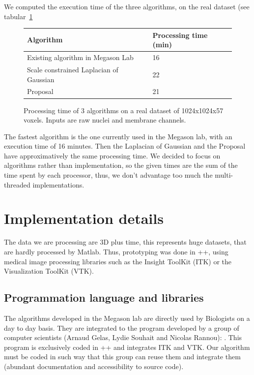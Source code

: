 We computed the execution time of the three algorithms, on the real dataset (see tabular~\ref{tab:timeEval}
\begin{figure}[htb]
\begin{center}
\begin{tabular}{|l|l|}
\hline Algorithm & Processing time (min) \\ 
\hline Existing algorithm in Megason Lab & 16 \\ 
\hline Scale constrained Laplacian of Gaussian &  22 \\ 
\hline Proposal & 21 \\
\hline
\end{tabular}
\end{center}
\caption{Processing time of 3 algorithms on a real dataset of 1024x1024x57 voxels. Inputs are raw nuclei and membrane channels.}
\label{tab:timeEval}
\end{figure}
The fastest algorithm is the one currently used in the Megason lab, with an execution time of 16 minutes.
Then the Laplacian of Gaussian and the Proposal have approximatively the same processing time.
We decided to focus on algorithms rather than implementation,
so the given times are the sum of the time spent by each processor,
thus, we don't advantage too much the multi-threaded implementations. 





\section{Implementation details}

The data we are processing are 3D plus time, this represents huge datasets, that are hardly processed by Matlab.
Thus, prototyping was done in {\C++}, using medical image processing libraries such as the Insight ToolKit (ITK)
or the Visualization ToolKit (VTK).

\subsection{Programmation language and libraries}

The algorithms developed in the Megason lab are directly used by Biologists on a day to day basis.
They are integrated to the program developed by a group of computer scientists (Arnaud Gelas, Lydie Souhait and Nicolas Rannou): {\gofigure}.
This program is exclusively coded in \C++ and integrates ITK and VTK.
Our algorithm must be coded in such way that this group can reuse them and integrate them (abundant documentation and accessibility to source code).

